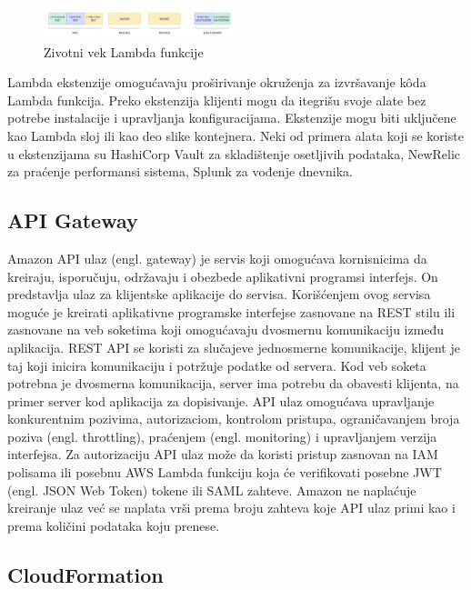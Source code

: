 \documentclass[12pt,oneside]{memoir}
\begin{document}
\begin{figure}[!ht]
  \centering
  \includegraphics[width=0.5\textwidth]{AWS-Lambda-zivotnivek.png}
  \caption{Zivotni vek Lambda funkcije}
  \label{fig:awsLambdaZivotniVek}
\end{figure}
 
Lambda ekstenzije omogućavaju proširivanje okruženja za izvršavanje kôda Lambda funkcija. Preko ekstenzija klijenti mogu da itegrišu svoje alate bez potrebe instalacije i upravljanja konfiguracijama. Ekstenzije mogu biti uključene kao Lambda sloj ili kao deo slike kontejnera. Neki od primera alata koji se koriste u ekstenzijama su HashiCorp Vault za skladištenje osetljivih podataka, NewRelic za praćenje performansi sistema, Splunk za vođenje dnevnika.

\subsection{API Gateway}
 
Amazon API ulaz (engl. gateway) je servis koji omogućava kornisnicima da kreiraju, isporučuju, održavaju i obezbede aplikativni programsi interfejs. On predstavlja ulaz za klijentske aplikacije do servisa. Korišćenjem ovog servisa moguće je kreirati aplikativne programske interfejse zasnovane na REST stilu ili zasnovane na veb soketima koji omogućavaju dvosmernu komunikaciju između aplikacija. REST API se koristi za slučajeve jednosmerne komunikacije, klijent je taj koji inicira komunikaciju i potržuje podatke od servera. Kod veb soketa potrebna je dvosmerna komunikacija, server ima potrebu da obavesti klijenta, na primer server kod aplikacija za dopisivanje. API ulaz omogućava upravljanje konkurentnim pozivima, autorizaciom, kontrolom pristupa, ograničavanjem broja poziva (engl. throttling), praćenjem (engl. monitoring) i upravljanjem verzija interfejsa. Za autorizaciju API ulaz može da koristi pristup zasnovan na IAM polisama ili posebnu AWS Lambda funkciju koja će verifikovati posebne JWT (engl. JSON Web Token) tokene ili SAML zahteve. Amazon ne naplaćuje kreiranje ulaz već se naplata vrši prema broju zahteva koje API ulaz primi kao i prema količini podataka koju prenese. 
 
\subsection{CloudFormation}
 
\end{document}

